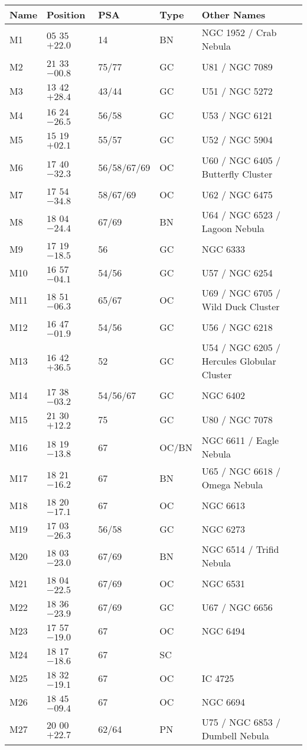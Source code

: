 \begin{table}[p]
\setlength{\tabcolsep}{3pt}
\scriptsize
\begin{tabular}{llllll}
\hline
Name&Position&PSA&Type&Other Names\\
\hline
M1&$05$ $35$ $+22.0$&14&BN&NGC 1952 / Crab Nebula\\
M2&$21$ $33$ $-00.8$&75/77&GC&U81 / NGC 7089\\
M3&$13$ $42$ $+28.4$&43/44&GC&U51 / NGC 5272\\
M4&$16$ $24$ $-26.5$&56/58&GC&U53 / NGC 6121\\
M5&$15$ $19$ $+02.1$&55/57&GC&U52 / NGC 5904\\
M6&$17$ $40$ $-32.3$&56/58/67/69&OC&U60 / NGC 6405 / Butterfly Cluster\\
M7&$17$ $54$ $-34.8$&58/67/69&OC&U62 / NGC 6475\\
M8&$18$ $04$ $-24.4$&67/69&BN&U64 / NGC 6523 / Lagoon Nebula\\
M9&$17$ $19$ $-18.5$&56&GC&NGC 6333\\
M10&$16$ $57$ $-04.1$&54/56&GC&U57 / NGC 6254\\
M11&$18$ $51$ $-06.3$&65/67&OC&U69 / NGC 6705 / Wild Duck Cluster\\
M12&$16$ $47$ $-01.9$&54/56&GC&U56 / NGC 6218\\
M13&$16$ $42$ $+36.5$&52&GC&U54 / NGC 6205 / Hercules Globular Cluster\\
M14&$17$ $38$ $-03.2$&54/56/67&GC&NGC 6402\\
M15&$21$ $30$ $+12.2$&75&GC&U80 / NGC 7078\\
M16&$18$ $19$ $-13.8$&67&OC/BN&NGC 6611 / Eagle Nebula\\
M17&$18$ $21$ $-16.2$&67&BN&U65 / NGC 6618 / Omega Nebula\\
M18&$18$ $20$ $-17.1$&67&OC&NGC 6613\\
M19&$17$ $03$ $-26.3$&56/58&GC&NGC 6273\\
M20&$18$ $03$ $-23.0$&67/69&BN&NGC 6514 / Trifid Nebula\\
M21&$18$ $04$ $-22.5$&67/69&OC&NGC 6531\\
M22&$18$ $36$ $-23.9$&67/69&GC&U67 / NGC 6656\\
M23&$17$ $57$ $-19.0$&67&OC&NGC 6494\\
M24&$18$ $17$ $-18.6$&67&SC&\\
M25&$18$ $32$ $-19.1$&67&OC&IC 4725\\
M26&$18$ $45$ $-09.4$&67&OC&NGC 6694\\
M27&$20$ $00$ $+22.7$&62/64&PN&U75 / NGC 6853 / Dumbell Nebula\\

\end{tabular}
\end{table}
